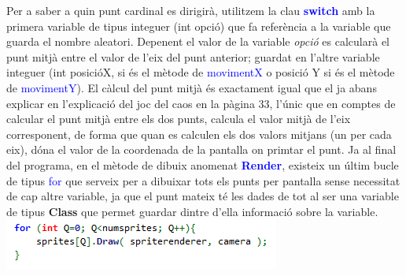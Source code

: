 \documentclass[12pt]{report}
\begin{document}
\begin{itemize}
{\newline
Per a saber a quin punt cardinal es dirigirà, utilitzem la clau \textbf{\textcolor{blue}{switch}} amb la primera variable de tipus integuer (\textcolor{naranja}{int} opció) que fa referència a la variable que guarda el nombre aleatori.
\newline
Depenent el valor de la variable \textit{opció} es calcularà el punt mitjà entre el valor de l'eix del punt anterior; guardat en l'altre variable integuer (\textcolor{naranja}{int} posicióX, si és el mètode de \textcolor{blue}{movimentX} o posició Y si és el mètode de \textcolor{blue}{movimentY}).
\newline
El càlcul del punt mitjà és exactament igual que el ja abans explicar en l'explicació del joc del caos en la pàgina 33, l'únic que en comptes de calcular el punt mitjà entre els dos punts, calcula el valor mitjà de l'eix corresponent, de forma que quan es calculen els dos valors mitjans (un per cada eix), dóna el valor de la coordenada de la pantalla on primtar el punt.
    \newline
    \newline
    Ja al final del programa, en el mètode de dibuix anomenat \textbf{\textcolor{blue}{Render}}, existeix un últim bucle de tipus \textcolor{blue}{for} que serveix per a dibuixar tots els punts per pantalla sense necessitat de cap altre variable, ja que el punt mateix té les dades de tot al ser una variable de tipus \textbf{Class} que permet guardar dintre d'ella informació sobre la variable.}
    \newline
    \includegraphics[width=0.7 \textwidth]{RenderTS.PNG}
    \begin{list}{}
        \item \hspace{5em}{Figura 3.19: Bucle de primtació dels punts per pantalla}
    \end{list}
    \newpage
    \begin{figure}

\end{figure}
\end{itemize}
\end{document}
